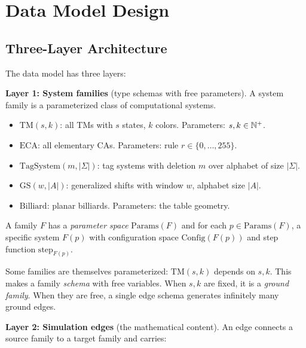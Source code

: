 \chapter{Data Model Design}\label{ch:design}

\section{Three-Layer Architecture}

The data model has three layers:

\textbf{Layer 1: System families} (type schemas with free parameters).
A system family is a parameterized class of computational systems.
\begin{itemize}
\item $\mathrm{TM}(s,k)$: all TMs with $s$ states, $k$ colors. Parameters: $s,k \in \mathbb{N}^+$.
\item $\mathrm{ECA}$: all elementary CAs. Parameters: rule $r \in \{0,\ldots,255\}$.
\item $\mathrm{TagSystem}(m,|\Sigma|)$: tag systems with deletion $m$ over alphabet of size $|\Sigma|$.
\item $\mathrm{GS}(w,|A|)$: generalized shifts with window $w$, alphabet size $|A|$.
\item $\mathrm{Billiard}$: planar billiards. Parameters: the table geometry.
\end{itemize}
A family $F$ has a \emph{parameter space} $\mathrm{Params}(F)$ and for each
$p \in \mathrm{Params}(F)$, a specific system $F(p)$ with configuration
space $\mathrm{Config}(F(p))$ and step function $\mathrm{step}_{F(p)}$.

Some families are themselves parameterized: $\mathrm{TM}(s,k)$ depends on $s,k$.
This makes a family \emph{schema} with free variables. When $s,k$ are fixed, it
is a \emph{ground family}. When they are free, a single edge schema generates
infinitely many ground edges.

\textbf{Layer 2: Simulation edges} (the mathematical content).
An edge connects a source family to a target family and carries:

